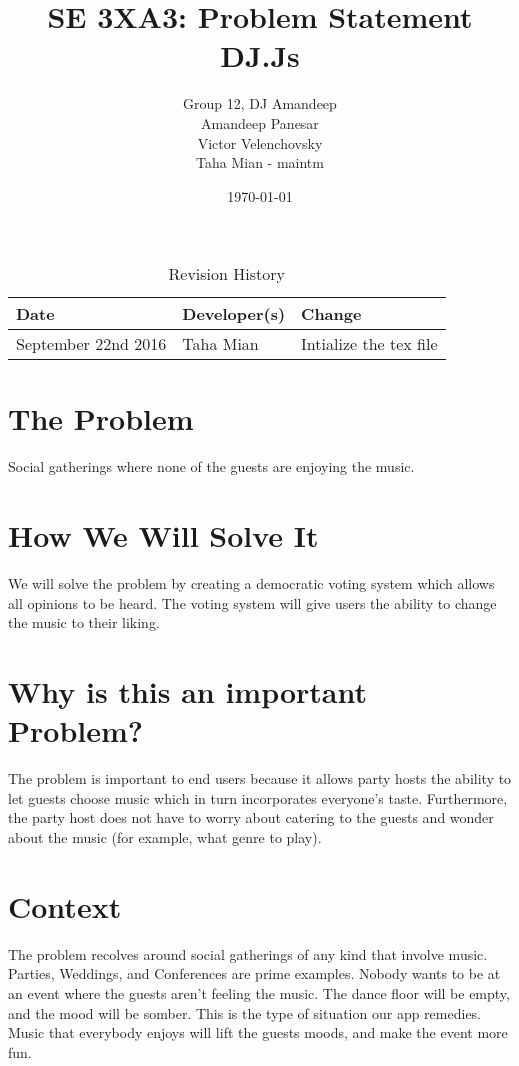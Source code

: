 \documentclass[11pt,fleqn]{article}
\title{SE 3XA3: Problem Statement\\DJ.Js}
\author{Group 12, DJ Amandeep\\
Amandeep Panesar \\ Victor Velenchovsky \\ Taha Mian - maintm}
\date{\today}
\begin{document}
\begin{table}[hp]
\caption{Revision History} \label{TblRevisionHistory}
\begin{tabularx}{\textwidth}{llX}
\toprule
\textbf{Date} & \textbf{Developer(s)} & \textbf{Change}\\
\midrule
September 22nd 2016 & Taha Mian & Intialize the tex file\\

\bottomrule
\end{tabularx}
\end{table}
\maketitle

\section{The Problem}
Social gatherings where none of the guests are enjoying the music.
\section{How We Will Solve It}
We will solve the problem by creating a democratic voting system which allows
all opinions to be heard. The voting system will give users the ability to
change the music to their liking.

\section{Why is this an important Problem?}
The problem is important to end users because it allows party hosts the ability
to let guests choose music which in turn incorporates everyone's taste.
Furthermore, the party host does not have to worry about catering to the guests
and wonder about the music (for example, what genre to play).

\section{Context}
The problem recolves around social gatherings of any kind that involve music.
Parties, Weddings, and Conferences are prime examples. Nobody wants to be at an
event where the guests aren't feeling the music. The dance floor will be
empty, and the mood will be somber. This is the type of situation our app
remedies. Music that everybody enjoys will lift the guests moods, and make
the event more fun.
\end{document}
